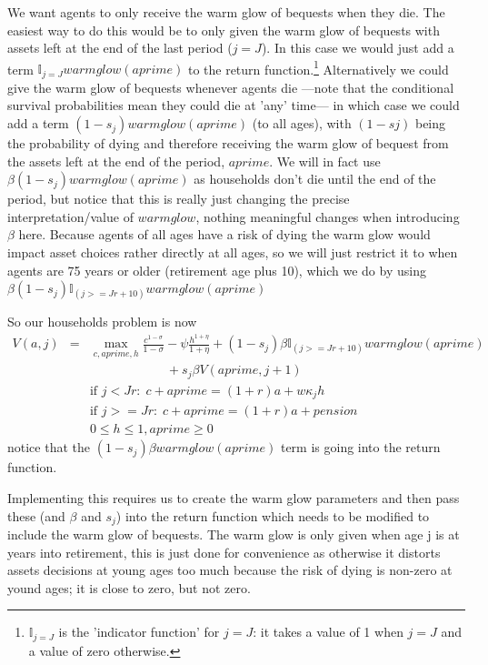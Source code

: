 We want agents to only receive the warm glow of bequests when they die. The easiest way to do this would be to only given the warm glow of bequests with assets left at the end of the last period ($j=J$). In this case we would just add a term $\mathbb{I}_{j=J} warmglow(aprime)$ to the return function.\footnote{$\mathbb{I}_{j=J}$ is the 'indicator function' for $j=J$: it takes a value of 1 when $j=J$ and a value of zero otherwise.} Alternatively we could give the warm glow of bequests whenever agents die ---note that the conditional survival probabilities mean they could die at 'any' time--- in which case we could add a term $(1-s_j) warmglow(aprime)$ (to all ages), with $(1-sj)$ being the probability of dying and therefore receiving the warm glow of bequest from the assets left at the end of the period, $aprime$. We will in fact use $\beta (1-s_j) warmglow(aprime)$ as households don't die until the end of the period, but notice that this is really just changing the precise interpretation/value of $warmglow$, nothing meaningful changes when introducing $\beta$ here. Because agents of all ages have a risk of dying the warm glow would impact asset choices rather directly at all ages, so we will just restrict it to when agents are 75 years or older (retirement age plus 10), which we do by using  $\beta (1-s_j) \mathbb{I}_{(j>=Jr+10)} warmglow(aprime)$

So our households problem is now
\begin{eqnarray*}
 V(a,j)&=& \max_{c,aprime,h} \frac{c^{1-\sigma}}{1-\sigma} - \psi \frac{h^{1+\eta}}{1+\eta} + (1-s_j)\beta \mathbb{I}_{(j>=Jr+10)} warmglow(aprime) \\
 && \quad \quad \quad \quad \quad \quad + s_j \beta V(aprime,j+1) \\
&& \text{if }j<Jr: \; c+aprime=(1+r)a+w \kappa_j h \\
&& \text{if }j>=Jr: \; c+aprime=(1+r)a +pension\\
&& 0\leq h \leq 1, aprime\geq 0
\end{eqnarray*}
notice that the $(1-s_j)\beta warmglow(aprime)$ term is going into the return function.

Implementing this requires us to create the warm glow parameters and then pass these (and $\beta$ and $s_j$) into the return function which needs to be modified to include the warm glow of bequests. The warm glow is only given when age j is at years into retirement, this is just done for convenience as otherwise it distorts assets decisions at young ages too much because the risk of dying is non-zero at yound ages; it is close to zero, but not zero.

